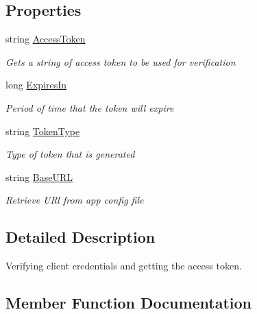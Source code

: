 \subsection*{Properties}
\begin{DoxyCompactItemize}
\item 
string \hyperlink{class_giift_a_p_i_c_sharp_1_1_token_aefecf4cb88e85c1dc1a56206ac34f794}{Access\+Token}
\begin{DoxyCompactList}\small\item\em Gets a string of access token to be used for verification \end{DoxyCompactList}\item 
long \hyperlink{class_giift_a_p_i_c_sharp_1_1_token_a207c33b24dbee8eb7dcdb3332b40f47f}{Expires\+In}
\begin{DoxyCompactList}\small\item\em Period of time that the token will expire \end{DoxyCompactList}\item 
string \hyperlink{class_giift_a_p_i_c_sharp_1_1_token_ad05023d32eee0720d09b4f95c915ffd8}{Token\+Type}
\begin{DoxyCompactList}\small\item\em Type of token that is generated \end{DoxyCompactList}\item 
string \hyperlink{class_giift_a_p_i_c_sharp_1_1_token_acb05b6661507a9b460cc3234e08a51f6}{Base\+U\+RL}
\begin{DoxyCompactList}\small\item\em Retrieve U\+Rl from app config file \end{DoxyCompactList}\end{DoxyCompactItemize}


\subsection{Detailed Description}
Verifying client credentials and getting the access token. 



\subsection{Member Function Documentation}
\mbox{\label{class_giift_a_p_i_c_sharp_1_1_token_abfbcfd0417479655fecd80c7f1c3285d}} 
